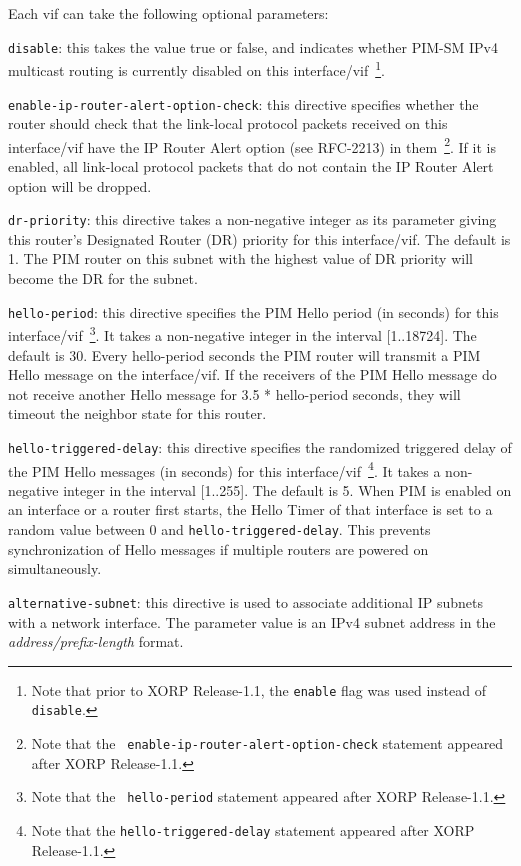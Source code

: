 \begin{description}
  Each {\stt vif} can take the following optional parameters:
\begin{description}
\item{\tt disable}: this takes the value {\stt true} or {\stt false},
  and indicates whether PIM-SM IPv4 multicast routing is currently
  disabled on this interface/vif~\footnote{Note
  that prior to XORP Release-1.1, the {\tt enable} flag was used instead of
  {\tt disable}.}.
\item{\tt enable-ip-router-alert-option-check}: this directive specifies
  whether the router should check that the link-local protocol packets
  received on this interface/vif have the IP Router Alert option (see
  RFC-2213) in them~\footnote{Note that the {\tt
  enable-ip-router-alert-option-check} statement appeared after XORP
  Release-1.1.}. If it is enabled, all link-local protocol packets that
  do not contain the IP Router Alert option will be dropped.
\item{\tt dr-priority}: this directive takes a non-negative integer as
  its parameter giving this router's Designated Router (DR) priority
  for this interface/vif.  The default is 1.  The PIM router on this
  subnet with the highest value of DR priority will become the DR for
  the subnet.
\item{\tt hello-period}: this directive specifies the PIM Hello period
  (in seconds) for this interface/vif~\footnote{Note that the {\tt
  hello-period} statement appeared after XORP Release-1.1.}. It takes a
  non-negative integer in the interval [1..18724].  The default is 30.
  Every {\stt hello-period} seconds the PIM router will transmit a PIM
  Hello message on the interface/vif. If the receivers of the PIM Hello
  message do not receive another Hello message for 3.5 * {\stt
  hello-period} seconds, they will timeout the neighbor state for this
  router.
\item{\tt hello-triggered-delay}: this directive specifies the randomized
  triggered delay of the PIM Hello messages (in seconds) for this
  interface/vif~\footnote{Note that the {\tt hello-triggered-delay} statement
  appeared after XORP Release-1.1.}. It takes a non-negative integer in the
  interval [1..255].  The default is 5. When PIM is enabled on an interface
  or a router first starts, the Hello Timer of that interface is set to a
  random value between 0 and {\tt hello-triggered-delay}.  This prevents
  synchronization of Hello messages if multiple routers are powered on
  simultaneously.
\item{\tt alternative-subnet}: this directive is used to associate
  additional IP subnets with a network interface. The parameter value
  is an IPv4 subnet address in the {\it address/prefix-length} format.


\end{description}
\end{description}
